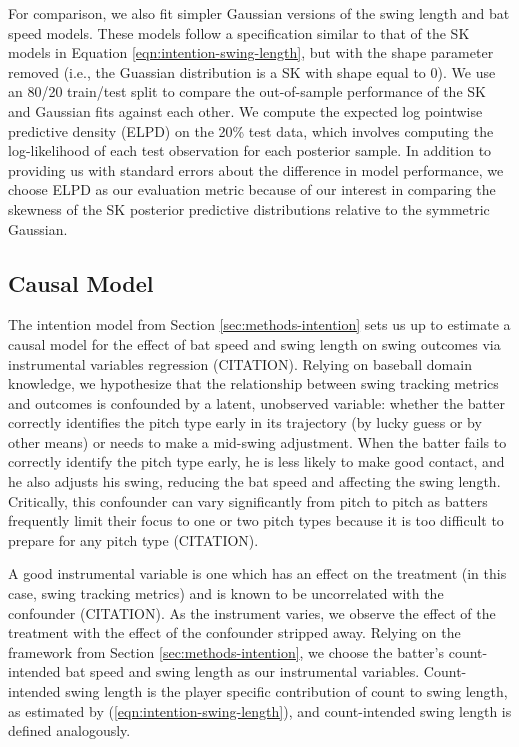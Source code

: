\documentclass{article}
\begin{document}
    For comparison, we also fit simpler Gaussian versions of the swing length and bat speed models. These models follow a specification similar to that of the SK models in Equation \ref{eqn:intention-swing-length}, but with the shape parameter removed (i.e., the Guassian distribution is a SK with shape equal to 0). We use an 80/20 train/test split to compare the out-of-sample performance of the SK and Gaussian fits against each other. We compute the expected log pointwise predictive density (ELPD) on the 20\% test data, which involves computing the log-likelihood of each test observation for each posterior sample. In addition to providing us with standard errors about the difference in model performance, we choose ELPD as our evaluation metric because of our interest in comparing the skewness of the SK posterior predictive distributions relative to the symmetric Gaussian.

    \subsection{Causal Model}
    \label{sec:methods-causal}

      The intention model from Section \ref{sec:methods-intention} sets us up to estimate a causal model for the effect of bat speed and swing length on swing outcomes via instrumental variables regression (CITATION). Relying on baseball domain knowledge, we hypothesize that the relationship between swing tracking metrics and outcomes is confounded by a latent, unobserved variable: whether the batter correctly identifies the pitch type early in its trajectory (by lucky guess or by other means) or needs to make a mid-swing adjustment. When the batter fails to correctly identify the pitch type early, he is less likely to make good contact, and he also adjusts his swing, reducing the bat speed and affecting the swing length. Critically, this confounder can vary significantly from pitch to pitch as batters frequently limit their focus to one or two pitch types because it is too difficult to prepare for any pitch type (CITATION).

      A good instrumental variable is one which has an effect on the treatment (in this case, swing tracking metrics) and is known to be uncorrelated with the confounder (CITATION). As the instrument varies, we observe the effect of the treatment with the effect of the confounder stripped away. Relying on the framework from Section \ref{sec:methods-intention}, we choose the batter's count-intended bat speed and swing length as our instrumental variables. Count-intended swing length is the player specific contribution of count to swing length, as estimated by (\ref{eqn:intention-swing-length}), and count-intended swing length is defined analogously.
\end{document}

